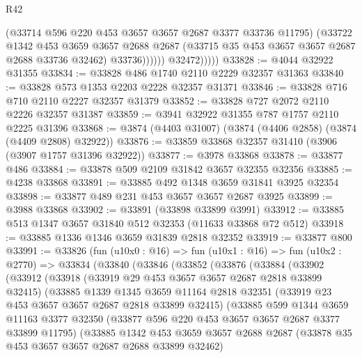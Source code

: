\begin{lexlean}{R42}
\begin{coremodule}
                        (@33714 @596 @220 @453 @3657 @3657 @2687 @3377 @33736 @11795)
                        (@33722
                          @1342
                          @453
                          @3659
                          @3657
                          @2688
                          @2687
                          (@33715 @35 @453 @3657 @3657 @2687 @2688 @33736 @32462)
                          @33736))))))
              @32472)))))
@33828 := @4044 @32922 @31355
@33834 := @33828 @486 @1740 @2110 @2229 @32357 @31363
@33840 := @33828 @573 @1353 @2203 @2228 @32357 @31371
@33846 := @33828 @716 @710 @2110 @2227 @32357 @31379
@33852 := @33828 @727 @2072 @2110 @2226 @32357 @31387
@33859 := @3941 @32922 @31355 @787 @1757 @2110 @2225 @31396
@33868 := @3874 (@4403 @31007) (@3874 (@4406 @2858) (@3874 (@4409 @2808) @32922))
@33876 := @33859 @33868 @32357 @31410 (@3906 (@3907 @1757 @31396 @32922))
@33877 := @3978 @33868
@33878 := @33877 @486
@33884 := @33878 @509 @2109 @31842 @3657 @32355 @32356
@33885 := @4238 @33868
@33891 := @33885 @492 @1348 @3659 @31841 @3925 @32354
@33898 := @33877 @489 @231 @453 @3657 @3657 @2687 @3925
@33899 := @3988 @33868
@33902 := @33891 (@33898 @33899 @3991)
@33912 := @33885 @513 @1347 @3657 @31840 @512 @32353 (@11633 @33868 @72 @512)
@33918 := @33885 @1336 @1346 @3659 @31839 @2818 @32352
@33919 := @33877 @800
@33991 := @33826
    (fun (u10x0 : @16) =>
    fun (u10x1 : @16) =>
    fun (u10x2 : @2770) =>
    @33834
      (@33840
        (@33846
          (@33852
            (@33876
              (@33884
                (@33902
                  (@33912
                    (@33918
                      (@33919 @29 @453 @3657 @3657 @2687 @2818 @33899 @32415)
                      (@33885
                        @1339
                        @1345
                        @3659
                        @11164
                        @2818
                        @32351
                        (@33919 @23 @453 @3657 @3657 @2687 @2818 @33899 @32415)
                        (@33885
                          @599
                          @1344
                          @3659
                          @11163
                          @3377
                          @32350
                          (@33877 @596 @220 @453 @3657 @3657 @2687 @3377 @33899 @11795)
                          (@33885
                            @1342
                            @453
                            @3659
                            @3657
                            @2688
                            @2687
                            (@33878 @35 @453 @3657 @3657 @2687 @2688 @33899 @32462)

\end{coremodule}
\end{lexlean}
